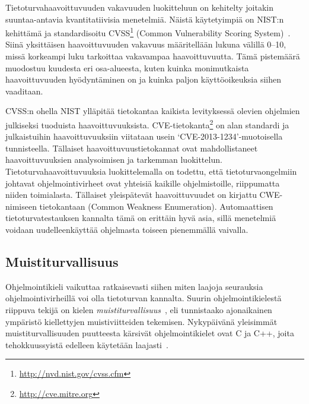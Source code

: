 Tietoturvahaavoittuvuuden vakavuuden luokitteluun on kehitelty joitakin suuntaa-antavia kvantitatiivisia menetelmiä.
Näistä käytetyimpiä on NIST:n kehittämä ja standardisoitu CVSS\footnote{\url{http://nvd.nist.gov/cvss.cfm}} (Common Vulnerability Scoring System)~\cite{CVSS}.
Siinä yksittäisen haavoittuvuuden vakavuus määritellään lukuna välillä 0--10,
missä korkeampi luku tarkoittaa vakavampaa haavoittuvuutta.
Tämä pistemäärä muodostuu kuudesta eri osa-alueesta,
kuten kuinka monimutkaista haavoittuvuuden hyödyntäminen on ja kuinka paljon käyttöoikeuksia siihen vaaditaan.

CVSS:n ohella NIST ylläpitää tietokantaa kaikista levityksessä olevien ohjelmien julkiseksi tuoduista haavoittuvuuksista.
CVE-tietokanta\footnote{\url{http://cve.mitre.org}} on alan standardi ja julkaistuihin haavoittuvuuksiin viitataan usein `CVE-2013-1234'-muotoisella tunnisteella.
Tällaiset haavoittuvuustietokannat ovat mahdollistaneet haavoittuvuuksien analysoimisen ja tarkemman luokittelun.
Tietoturvahaavoittuvuuksia luokittelemalla on todettu,
että tietoturvaongelmiin johtavat ohjelmointivirheet ovat yhteisiä kaikille ohjelmistoille,
riippumatta niiden toimialasta.
Tällaiset yleispätevät haavoittuvuudet on kirjattu CWE-nimiseen tietokantaan (Common Weakness Enumeration).
Automaattisen tietoturvatestauksen kannalta tämä on erittäin hyvä asia,
sillä menetelmiä voidaan uudelleenkäyttää ohjelmasta toiseen pienemmällä vaivalla.

\subsection{Muistiturvallisuus}
\label{Muistivirheet}

Ohjelmointikieli vaikuttaa ratkaisevasti siihen miten laajoja seurauksia ohjelmointivirheillä voi olla tietoturvan kannalta.
Suurin ohjelmointikielestä riippuva tekijä on kielen \emph{muistiturvallisuus}~\cite{SoftBound},
eli tunnistaako ajonaikainen ympäristö kiellettyjen muistiviitteiden tekemisen.
Nykypäivänä yleisimmät muistiturvallisuuden puutteesta kärsivät ohjelmointikielet ovat C ja C++,
joita tehokkuussyistä edelleen käytetään laajasti~\cite{StaticallyDetecting,SoftBound}.

